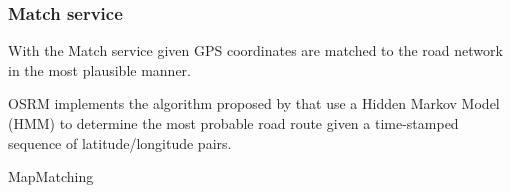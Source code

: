 \autocite[]{Luxen2011}







\subsubsection{Match service}

With the Match service given GPS coordinates are matched to the road network in the most plausible manner.

OSRM implements the algorithm proposed by \autocite[]{Yuan2020} that use a Hidden Markov Model (HMM) to determine the most probable road route given a time-stamped sequence of latitude/longitude pairs. 




MapMatching \autocite[]{Yuan2020}



